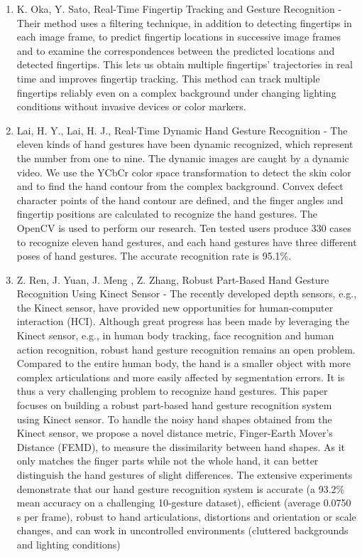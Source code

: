 \documentclass[11pt]{report}
\begin{document}
\begin{enumerate}
    \item K. Oka, Y. Sato, Real-Time Fingertip Tracking and Gesture Recognition \cite{1} - Their method uses a filtering technique, in addition to detecting fingertips  in  each  image  frame,  to predict fingertip locations in successive image frames and to examine the correspondences between the predicted locations and detected fingertips. This lets us obtain multiple fingertips’ trajectories in real time and improves fingertip tracking. This method can track multiple fingertips reliably even on a complex background under changing lighting conditions without invasive devices or color markers.
    
    \item Lai, H. Y., Lai, H. J., Real-Time Dynamic Hand Gesture Recognition \cite{2} - The  eleven  kinds  of  hand  gestures have  been  dynamic  recognized,  which  represent  the  number from  one  to  nine.  The  dynamic  images  are  caught  by  a  dynamic video.  We  use  the  YCbCr  color  space  transformation  to  detect the  skin  color  and  to  find  the  hand  contour from  the  complex background. Convex defect character points of the hand contour are  defined,  and  the  finger  angles  and  fingertip  positions  are calculated to recognize the hand gestures. The OpenCV is used to perform our research. Ten tested users produce 330 cases to recognize  eleven  hand  gestures,  and  each  hand  gestures  have  three different poses of hand gestures.  The accurate recognition rate is 95.1\%.

    \item Z. Ren, J. Yuan, J. Meng , Z. Zhang, Robust Part-Based Hand Gesture Recognition Using Kinect Sensor \cite{3} - The recently developed depth sensors, e.g., the Kinect sensor, have provided new opportunities for human-computer interaction (HCI). Although great progress has been made by leveraging the Kinect sensor, e.g., in human body tracking, face recognition and human action recognition, robust hand gesture recognition remains an open problem. Compared to the entire human body, the hand is a smaller object with more complex articulations and more easily affected by segmentation errors. It is thus a very challenging problem to recognize hand gestures. This paper focuses on building a robust part-based hand gesture recognition system using Kinect sensor. To handle the noisy hand shapes obtained from the Kinect sensor, we propose a novel distance metric, Finger-Earth Mover's Distance (FEMD), to measure the dissimilarity between hand shapes. As it only matches the finger parts while not the whole hand, it can better distinguish the hand gestures of slight differences. The extensive experiments demonstrate that our hand gesture recognition system is accurate (a 93.2\% mean accuracy on a challenging 10-gesture dataset), efficient (average 0.0750 s per frame), robust to hand articulations, distortions and orientation or scale changes, and can work in uncontrolled environments (cluttered backgrounds and lighting conditions)
    

\end{enumerate}
\end{document}
